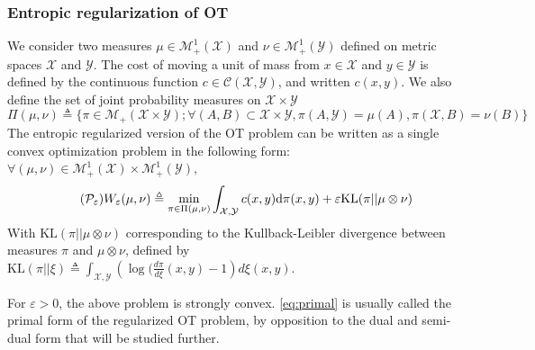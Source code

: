 \subsubsection{Entropic regularization of OT}
We consider two measures $\mu \in \mathcal{M}_+^1(\mathcal{X})$ and $\nu \in \mathcal{M}_+^1(\mathcal{Y})$ defined on metric spaces $\mathcal{X}$ and $\mathcal{Y}$. The cost of moving a unit of mass from $x\in \mathcal{X}$ and  $y\in \mathcal{Y}$ is defined by the continuous function $c \in \mathcal{C}(\mathcal{X}, \mathcal{Y})$, and written $c(x, y)$.
We also define the set of joint probability measures on $\mathcal{X}\times\mathcal{Y}$
\[
\Pi(\mu, \nu) \triangleq \{\pi \in \mathcal{M}_+(\mathcal{X}\times \mathcal{Y}) ; \forall (A, B) \subset \mathcal{X}\times \mathcal{Y}, \pi(A, \mathcal{Y}) = \mu(A), \pi(\mathcal{X}, B) = \nu(B)\}
\]
The entropic regularized version of the OT problem \cite{cuturi_sinkhorn_2013} can be written as a single convex optimization problem in the following form: $\forall (\mu, \nu)  \in \mathcal{M}_+^1(\mathcal{X})\times\mathcal{M}_+^1(\mathcal{Y}),$
\[\tag{$\mathcal{P}_\varepsilon$}
\label{eq:primal}
W_\varepsilon(\mu, \nu) \triangleq \min_{\pi\in \Pi(\mu, \nu)} \int_{\mathcal{X}, \mathcal{Y}} c(x, y)\text{d} \pi(x, y) + \varepsilon\text{KL}(\pi|| \mu \otimes \nu)
\]
With $\text{KL}(\pi|| \mu \otimes \nu)$ corresponding to the Kullback-Leibler divergence between measures $\pi$ and  $\mu \otimes \nu$, defined by $\text{KL}(\pi|| \xi) \triangleq  \int_{\mathcal{X}, \mathcal{Y}} \left(\log(\frac{d\pi}{d\xi}(x, y) - 1\right)d\xi(x, y)$.

For $\varepsilon > 0$, the above problem is strongly convex. \eqref{eq:primal} is usually called the primal form of the regularized OT problem, by opposition to the dual and semi-dual form that will be studied further.

